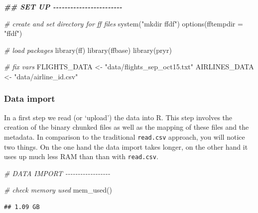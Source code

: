 \documentclass[
  12pt,
]{style/krantz}
\newenvironment{Shaded}{\begin{snugshade}}{\end{snugshade}}
\newcommand{\AttributeTok}[1]{\textcolor[rgb]{0.77,0.63,0.00}{#1}}
\newcommand{\CommentTok}[1]{\textcolor[rgb]{0.56,0.35,0.01}{\textit{#1}}}
\newcommand{\DocumentationTok}[1]{\textcolor[rgb]{0.56,0.35,0.01}{\textbf{\textit{#1}}}}
\newcommand{\FunctionTok}[1]{\textcolor[rgb]{0.00,0.00,0.00}{#1}}
\newcommand{\NormalTok}[1]{#1}
\newcommand{\OtherTok}[1]{\textcolor[rgb]{0.56,0.35,0.01}{#1}}
\newcommand{\StringTok}[1]{\textcolor[rgb]{0.31,0.60,0.02}{#1}}
\begin{document}
\begin{Shaded}
\begin{Highlighting}[]
\DocumentationTok{\#\# SET UP {-}{-}{-}{-}{-}{-}{-}{-}{-}{-}{-}{-}{-}{-}{-}{-}{-}{-}{-}{-}{-}{-}{-}{-}}

\CommentTok{\# create and set directory for ff files}
\FunctionTok{system}\NormalTok{(}\StringTok{"mkdir ffdf"}\NormalTok{)}
\FunctionTok{options}\NormalTok{(}\AttributeTok{fftempdir =} \StringTok{"ffdf"}\NormalTok{)}

\CommentTok{\# load packages}
\FunctionTok{library}\NormalTok{(ff)}
\FunctionTok{library}\NormalTok{(ffbase)}
\FunctionTok{library}\NormalTok{(pryr)}

\CommentTok{\# fix vars}
\NormalTok{FLIGHTS\_DATA }\OtherTok{\textless{}{-}} \StringTok{"data/flights\_sep\_oct15.txt"}
\NormalTok{AIRLINES\_DATA }\OtherTok{\textless{}{-}} \StringTok{"data/airline\_id.csv"}
\end{Highlighting}
\end{Shaded}

\hypertarget{data-import}{%
\subsubsection{Data import}\label{data-import}}

In a first step we read (or `upload') the data into R. This step involves the creation of the binary chunked files as well as the mapping of these files and the metadata. In comparison to the traditional \texttt{read.csv} approach, you will notice two things. On the one hand the data import takes longer, on the other hand it uses up much less RAM than than with \texttt{read.csv}.

\begin{Shaded}
\begin{Highlighting}[]
\CommentTok{\# DATA IMPORT {-}{-}{-}{-}{-}{-}{-}{-}{-}{-}{-}{-}{-}{-}{-}{-}{-}{-}}

\CommentTok{\# check memory used}
\FunctionTok{mem\_used}\NormalTok{()}
\end{Highlighting}
\end{Shaded}

\begin{verbatim}
## 1.09 GB
\end{verbatim}
\end{document}
